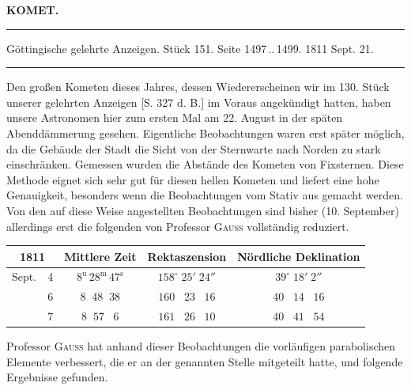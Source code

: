 \clearpage{}\hypertarget{native-342-lower}{}\label{native-342-lower}
\begin{center}\textbf{KOMET.}\par\vspace{4pt}\hrule\vspace{4pt}\fontsize{10}{12}\selectfont Göttingische gelehrte Anzeigen. Stück 151. Seite 1497\,..\,1499. 1811 Sept. 21.\par\vspace{4pt}\hrule\vspace{4pt}\end{center}

\par\indent Den großen Kometen dieses Jahres, dessen Wiedererscheinen wir im 130. Stück unserer gelehrten Anzeigen [S. 327 d. B.] im Voraus angekündigt hatten, haben unsere Astronomen hier zum ersten Mal am 22. August in der späten Abenddämmerung gesehen. Eigentliche Beobachtungen waren erst später möglich, da die Gebäude der Stadt die Sicht von der Sternwarte nach Norden zu stark einschränken. Gemessen wurden die Abstände des Kometen von Fixsternen. Diese Methode eignet sich sehr gut für diesen hellen Kometen und liefert eine hohe Genauigkeit, besonders wenn die Beobachtungen vom Stativ aus gemacht werden. Von den auf diese Weise angestellten Beobachtungen sind bisher (10. September) allerdings erst die folgenden von Professor \textsc{Gauss} vollständig reduziert.

\begin{center}\fontsize{10}{12}\selectfont\setlength{\tabcolsep}{4pt}\renewcommand{\arraystretch}{1.15}\begin{tabular}{ll|c|c|c}
\multicolumn{2}{c|}{1811} & Mittlere Zeit & Rektaszension & Nördliche Deklination \\\hline
Sept. & 4 & $8^{\mathrm u}\,28^{\mathrm m}\,47^{\mathrm s}$ & $158^\circ\;25'\;24''$ & $39^\circ\;18'\;2''$ \\
 & 6 & $8\;\;48\;\;38$ & $160\;\;\;23\;\;\;16$ & $40\;\;\;14\;\;\;16$ \\
 & 7 & $8\;\;57\;\;\;6$ & $161\;\;\;26\;\;\;10$ & $40\;\;\;41\;\;\;54$ \\
\end{tabular}
\end{center}

\par\indent Professor \textsc{Gauss} hat anhand dieser Beobachtungen die vorläufigen parabolischen Elemente verbessert, die er an der genannten Stelle mitgeteilt hatte, und folgende Ergebnisse gefunden.


